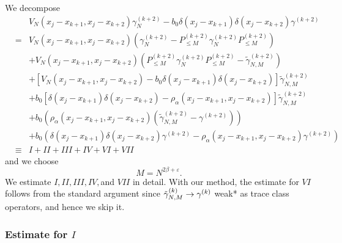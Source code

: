\documentclass[12pt,letterpaper,leqno]{amsart}
\theoremstyle{plain}
\numberwithin{equation}{section}
\numberwithin{theorem}{section}
\numberwithin{proposition}{section}
\numberwithin{lemma}{section}
\numberwithin{corollary}{section}
\begin{document}
We decompose%
\begin{eqnarray*}
&&V_{N}\left( x_{j}-x_{k+1},x_{j}-x_{k+2}\right) \gamma
_{N}^{(k+2)}-b_{0}\delta (x_{j}-x_{k+1})\delta (x_{j}-x_{k+2})\gamma ^{(k+2)}
\\
&=&V_{N}\left( x_{j}-x_{k+1},x_{j}-x_{k+2}\right) \left( \gamma
_{N}^{(k+2)}-P_{\leqslant M}^{(k+2)}\gamma _{N}^{(k+2)}P_{\leqslant
M}^{(k+2)}\right) \\
&&+V_{N}\left( x_{j}-x_{k+1},x_{j}-x_{k+2}\right) \left( P_{\leqslant
M}^{(k+2)}\gamma _{N}^{(k+2)}P_{\leqslant M}^{(k+2)}-\tilde{\gamma}%
_{N,M}^{(k+2)}\right) \\
&&+\left[ V_{N}\left( x_{j}-x_{k+1},x_{j}-x_{k+2}\right) -b_{0}\delta
(x_{j}-x_{k+1})\delta (x_{j}-x_{k+2})\right] \tilde{\gamma}_{N,M}^{(k+2)} \\
&&+b_{0}\left[ \delta (x_{j}-x_{k+1})\delta (x_{j}-x_{k+2})-\rho _{\alpha
}\left( x_{j}-x_{k+1},x_{j}-x_{k+2}\right) \right] \tilde{\gamma}%
_{N,M}^{(k+2)} \\
&&+b_{0}\left( \rho _{\alpha }\left( x_{j}-x_{k+1},x_{j}-x_{k+2}\right)
\left( \tilde{\gamma}_{N,M}^{(k+2)}-\gamma ^{(k+2)}\right) \right) \\
&&+b_{0}(\delta (x_{j}-x_{k+1})\delta (x_{j}-x_{k+2})\gamma ^{(k+2)}-\rho
_{\alpha }\left( x_{j}-x_{k+1},x_{j}-x_{k+2}\right) \gamma ^{(k+2)}) \\
&\equiv &I+II+III+IV+VI+VII
\end{eqnarray*}%
and we choose 
\begin{equation}
M=N^{2\beta +\varepsilon }.  \label{eqn:choice of M in convergence}
\end{equation}%
We estimate $I,II,III,IV,$and $VII$ in detail. With our method, the estimate
for $VI$ follows from the standard argument \cite{Kirpatrick} since $\tilde{%
\gamma}_{N,M}^{(k)}\rightarrow \gamma ^{(k)}$ weak* as trace class
operators, and hence we skip it.

\subsubsection{Estimate for $I$}
\end{document}
